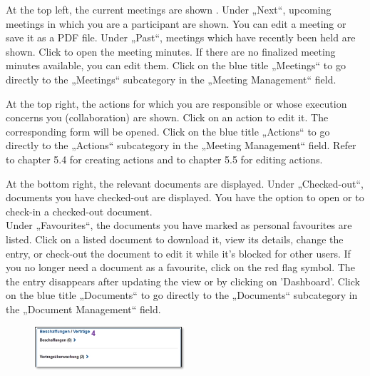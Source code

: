 At the top left, the current meetings are shown . Under „Next“, upcoming meetings in which you are a participant are shown. You can edit a meeting or save it as a PDF file. Under „Past“, meetings which have recently been held are shown. Click to open the meeting minutes. If there are no finalized meeting minutes available, you can edit them. Click on the blue title „Meetings“  to go directly to the „Meetings“ subcategory in the „Meeting Management“ field.

\vspace{\baselineskip}

At the top right, the actions  for which you are responsible or whose execution concerns you (collaboration) are shown. Click on an action to edit it. The corresponding form will be opened. Click on the blue title „Actions“  to go directly to the „Actions“ subcategory in the „Meeting Management“ field. Refer to chapter 5.4 for creating actions and to chapter 5.5 for editing actions.

\vspace{\baselineskip}

At the bottom right, the relevant documents  are displayed. Under „Checked-out“, documents you have checked-out are displayed. You have the option to open or to check-in a checked-out document. \\

Under „Favourites“, the documents you have marked as personal favourites are listed. Click on a listed document to download it, view its details, change the entry, or check-out the document to edit it while it's blocked for other users. If you no longer need a document as a favourite, click on the red flag symbol. The the entry disappears after updating the view or by clicking on 'Dashboard'. Click on the blue title „Documents“  to go directly to the „Documents“ subcategory in the „Document Management“ field.

\vspace{\baselineskip}


\begin{figure}
  \vspace{-20pt}
  \begin{center}
    \includegraphics[width=0.5\textwidth]{../chapters/01_Einfuehrung/pictures/1-3-2_persUebersichtBeschaffung.jpg}
  \end{center}
  \vspace{-20pt}
  \vspace{-10pt}
\end{figure}

